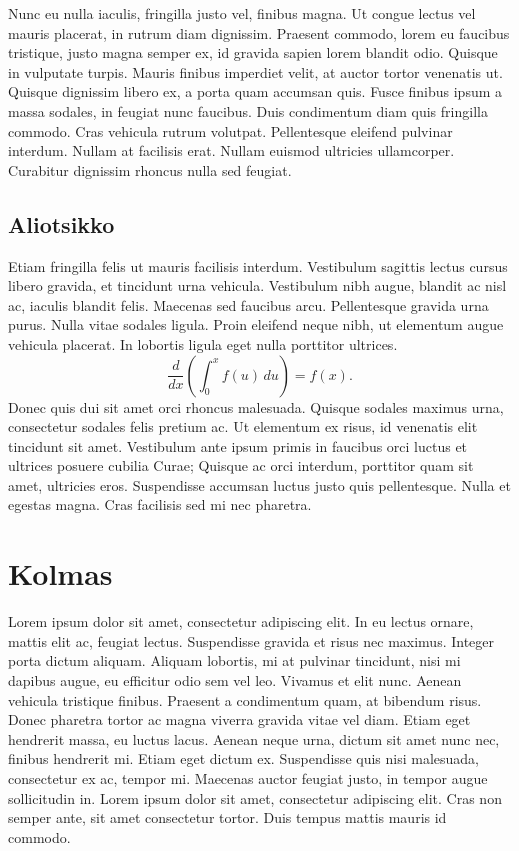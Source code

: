 \documentclass[12pt,a4paper,twoside]{article}
\begin{document}
Nunc eu nulla iaculis, fringilla justo vel, finibus magna. Ut congue lectus vel mauris placerat, in rutrum diam dignissim. Praesent commodo, lorem eu faucibus tristique, justo magna semper ex, id gravida sapien lorem blandit odio. Quisque in vulputate turpis. Mauris finibus imperdiet velit, at auctor tortor venenatis ut. Quisque dignissim libero ex, a porta quam accumsan quis. Fusce finibus ipsum a massa sodales, in feugiat nunc faucibus. Duis condimentum diam quis fringilla commodo. Cras vehicula rutrum volutpat. Pellentesque eleifend pulvinar interdum. Nullam at facilisis erat. Nullam euismod ultricies ullamcorper. Curabitur dignissim rhoncus nulla sed feugiat.

\subsection{Aliotsikko}
Etiam fringilla felis ut mauris facilisis interdum. Vestibulum sagittis lectus cursus libero gravida, et tincidunt urna vehicula. Vestibulum nibh augue, blandit ac nisl ac, iaculis blandit felis. Maecenas sed faucibus arcu. Pellentesque gravida urna purus. Nulla vitae sodales ligula. Proin eleifend neque nibh, ut elementum augue vehicula placerat. In lobortis ligula eget nulla porttitor ultrices.
\begin{displaymath}
        \frac{d}{dx}\left( \int_{0}^{x} f(u)\,du\right)=f(x).
\end{displaymath}
Donec quis dui sit amet orci rhoncus malesuada. Quisque sodales maximus urna, consectetur sodales felis pretium ac. Ut elementum ex risus, id venenatis elit tincidunt sit amet. Vestibulum ante ipsum primis in faucibus orci luctus et ultrices posuere cubilia Curae; Quisque ac orci interdum, porttitor quam sit amet, ultricies eros. Suspendisse accumsan luctus justo quis pellentesque. Nulla et egestas magna. Cras facilisis sed mi nec pharetra. 

\section{Kolmas}

Lorem ipsum dolor sit amet, consectetur adipiscing elit. In eu lectus ornare, mattis elit ac, feugiat lectus. Suspendisse gravida et risus nec maximus. Integer porta dictum aliquam. Aliquam lobortis, mi at pulvinar tincidunt, nisi mi dapibus augue, eu efficitur odio sem vel leo. Vivamus et elit nunc. Aenean vehicula tristique finibus. Praesent a condimentum quam, at bibendum risus. Donec pharetra tortor ac magna viverra gravida vitae vel diam. Etiam eget hendrerit massa, eu luctus lacus. Aenean neque urna, dictum sit amet nunc nec, finibus hendrerit mi. Etiam eget dictum ex. Suspendisse quis nisi malesuada, consectetur ex ac, tempor mi. Maecenas auctor feugiat justo, in tempor augue sollicitudin in. Lorem ipsum dolor sit amet, consectetur adipiscing elit. Cras non semper ante, sit amet consectetur tortor. Duis tempus mattis mauris id commodo.
\end{document}
